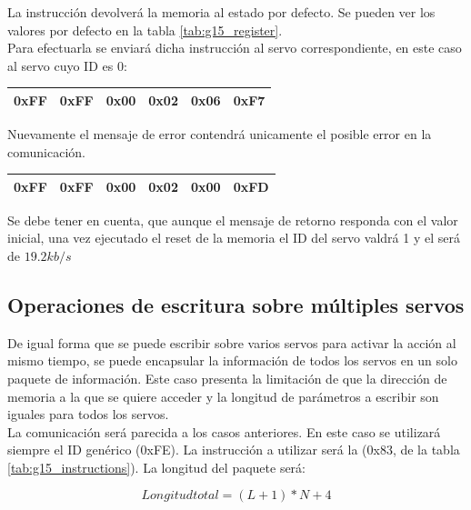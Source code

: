 		La instrucción  devolverá la memoria al estado por defecto. Se pueden ver los valores por defecto en la tabla \ref{tab:g15_register}.
		\\
		
		Para efectuarla se enviará dicha instrucción al servo correspondiente, en este caso al servo cuyo ID es 0:
		\begin{center}
			\begin{tabular}{|c|c|c|c|c|c|}
				\hline
				0xFF & 0xFF & 0x00 & 0x02 & 0x06 & 0xF7 \\
				\hline
			\end{tabular}
		\end{center}
		
		 Nuevamente el mensaje de error contendrá unicamente el posible error en la comunicación.
		 \begin{center}
		 	\begin{tabular}{|c|c|c|c|c|c|}
		 		\hline
		 		0xFF & 0xFF & 0x00 & 0x02 & 0x00 & 0xFD \\
		 		\hline
		 	\end{tabular}
		 \end{center}
		 
		 Se debe tener en cuenta, que aunque el mensaje de retorno responda con el valor inicial, una vez ejecutado el reset de la memoria el ID del servo valdrá 1 y el  será de $19.2kb/s$
	
	\subsection{Operaciones de escritura sobre múltiples servos}
		De igual forma que se puede escribir sobre varios servos para activar la acción al mismo tiempo, se puede encapsular la información de todos los servos en un solo paquete de información. Este caso presenta la limitación de que la dirección de memoria a la que se quiere acceder y la longitud de parámetros a escribir son iguales para todos los servos.
		\\
		
		La comunicación será parecida a los casos anteriores. En este caso se utilizará siempre el ID genérico (0xFE). La instrucción a utilizar será la  (0x83, de la tabla \ref{tab:g15_instructions}). La longitud del paquete será:
		
		\begin{equation}
		\label{ec:regG15:Syncwritelength}
			Longitud total = (L+1) * N + 4
		\end{equation}
		
